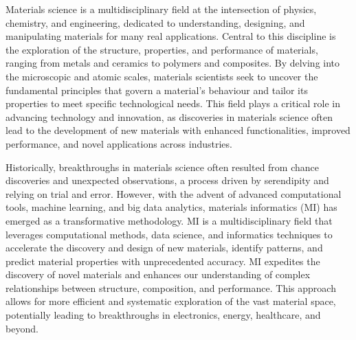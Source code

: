 

Materials science is a multidisciplinary field at the intersection of physics, chemistry, and engineering, dedicated to understanding, designing, and manipulating materials for many real applications. 
Central to this discipline is the exploration of the structure, properties, and performance of materials, ranging from metals and ceramics to polymers and composites. By delving into the microscopic and atomic scales, materials scientists seek to uncover the fundamental principles that govern a material's behaviour and tailor its properties to meet specific technological needs. 
This field plays a critical role in advancing technology and innovation, as discoveries in materials science often lead to the development of new materials with enhanced functionalities, improved performance, and novel applications across industries.

Historically, breakthroughs in materials science often resulted from chance discoveries and unexpected observations, a process driven by serendipity and relying on trial and error. 
However, with the advent of advanced computational tools, machine learning, and big data analytics, materials informatics (MI) has emerged as a transformative methodology. 
MI is a multidisciplinary field that leverages computational methods, data science, and informatics techniques to accelerate the discovery and design of new materials, identify patterns, and predict material properties with unprecedented accuracy. 
MI expedites the discovery of novel materials and enhances our understanding of complex relationships between structure, composition, and performance. 
This approach allows for more efficient and systematic exploration of the vast material space, potentially leading to breakthroughs in electronics, energy, healthcare, and beyond. 

